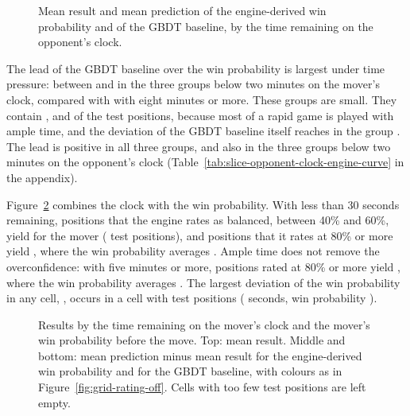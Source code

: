 \documentclass[11pt]{article}
\begin{document}
\begin{figure}[htbp]\centering
{}
\caption{Mean result and mean prediction of the engine-derived win
probability and of the GBDT baseline, by the time remaining on the opponent's
clock.}
\label{fig:opponent-clock}
\end{figure}

The lead of the GBDT baseline over the win probability is largest under time
pressure: between  and
 in the three groups below two
minutes on the mover's clock, compared with
 with eight minutes or more. These
groups are small. They contain ,
 and  of the
 test positions, because most of a rapid game is played
with ample time, and the deviation of the GBDT baseline itself reaches
 in the group
. The lead is positive in all
three groups, and also in the three groups below two minutes on the
opponent's clock (Table~\ref{tab:slice-opponent-clock-engine-curve} in the
appendix).

Figure~\ref{fig:grid-clock} combines the clock with the win probability.
With less than 30 seconds remaining, positions that the engine rates as
balanced, between 40\% and 60\%, yield 
for the mover ( test positions), and
positions that it rates at 80\% or more yield
, where the win probability averages
. Ample time does not remove the
overconfidence: with five minutes or more, positions rated at 80\% or more
yield , where the win probability
averages . The largest deviation
of the win probability in any cell, ,
occurs in a cell with  test positions
( seconds, win probability
).

\begin{figure}[htbp]\centering
{}

\medskip
{}
\caption{Results by the time remaining on the mover's clock and the mover's
win probability before the move. Top: mean result. Middle and bottom: mean
prediction minus mean result for the engine-derived win probability and for
the GBDT baseline, with colours as in Figure~\ref{fig:grid-rating-off}. Cells
with too few test positions are left empty.}
\label{fig:grid-clock}
\end{figure}
\end{document}
